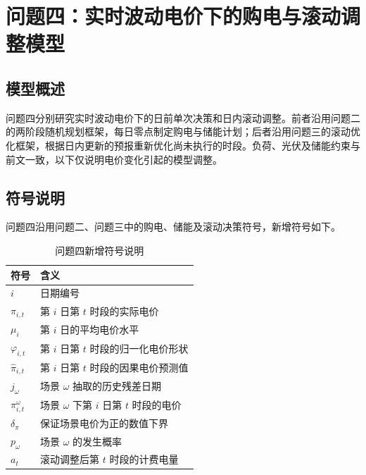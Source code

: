 \section{问题四：实时波动电价下的购电与滚动调整模型}
\subsection{模型概述}
问题四分别研究实时波动电价下的日前单次决策和日内滚动调整。前者沿用问题二的两阶段随机规划框架，每日零点制定购电与储能计划；后者沿用问题三的滚动优化框架，根据日内更新的预报重新优化尚未执行的时段。负荷、光伏及储能约束与前文一致，以下仅说明电价变化引起的模型调整。

\subsection{符号说明}

问题四沿用问题二、问题三中的购电、储能及滚动决策符号，新增符号如下。

\begin{table}[H]
    \centering
    \caption{问题四新增符号说明}
    \label{tab:q4_symbols}
    \renewcommand{\arraystretch}{1.25}
    \begin{tabularx}{0.92\textwidth}{
        >{\centering\arraybackslash}p{}
        >{\centering\arraybackslash}X}
        \toprule
        符号 & 含义 \\
        \midrule
        $i$ & 日期编号 \\
        $\pi_{i,t}$ & 第 $i$ 日第 $t$ 时段的实际电价 \\
        $\mu_i$ & 第 $i$ 日的平均电价水平 \\
        $\varphi_{i,t}$ & 第 $i$ 日第 $t$ 时段的归一化电价形状 \\
        $\widehat{\pi}_{i,t}$ & 第 $i$ 日第 $t$ 时段的因果电价预测值 \\
        $j_\omega$ & 场景 $\omega$ 抽取的历史残差日期 \\
        $\pi_{i,t}^{\omega}$ & 场景 $\omega$ 下第 $i$ 日第 $t$ 时段的电价 \\
        $\delta_\pi$ & 保证场景电价为正的数值下界 \\
        $p_\omega$ & 场景 $\omega$ 的发生概率 \\
        $a_t$ & 滚动调整后第 $t$ 时段的计费电量 \\
        \bottomrule
    \end{tabularx}
\end{table}

